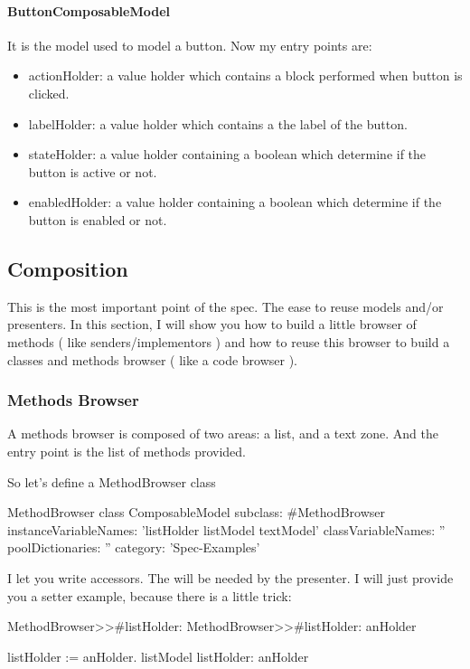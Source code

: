 \documentclass[a4paper,10pt,twoside]{book}
\begin{document}
\paragraph{ButtonComposableModel} It is the model used to model a button.
Now my entry points are:
\begin{itemize}
	\item actionHolder: a value holder which contains a block performed when button is clicked.
	\item labelHolder: a value holder which contains a the label of the button.
	\item stateHolder: a value holder containing a boolean which determine if the button is active or not.
	\item enabledHolder: a value holder containing a boolean which determine if the button is enabled or not.
	\end{itemize}

\subsection{Composition}

This is the most important point of the spec. The ease to reuse models and/or presenters.
In this section, I will show you how to build a little browser of methods ( like senders/implementors ) and how to reuse this browser to build a classes and methods browser ( like a code browser ).

\subsubsection{Methods Browser}

A methods browser is composed of two areas: a list, and a text zone. And the entry point is the list of methods provided.

So let's define a MethodBrowser class

\begin{classdef}{MethodBrowser class}
ComposableModel subclass: #MethodBrowser
	instanceVariableNames: 'listHolder listModel textModel'
	classVariableNames: ''
	poolDictionaries: ''
	category: 'Spec-Examples'
\end{classdef}

I let you write accessors. The will be needed by the presenter.
I will just provide you a setter example, because there is a little trick:

\begin{method}{MethodBrowser>>\#listHolder:}
MethodBrowser>>#listHolder: anHolder
	
	listHolder := anHolder.
	listModel listHolder: anHolder
\end{method}
\end{document}

